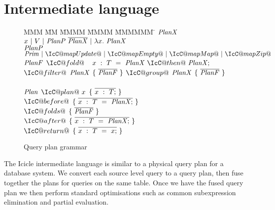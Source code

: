 \section{Intermediate language}
\label{icicle:s:IcicleCore}

\begin{figure}

\begin{tabbing}
MMM \= MM \= MMMM \= MMMM \= MMMMMM \= \kill
$\mathit{PlanX}$
\GrammarDefTab
  $x~|~V~|~\mathit{PlanP}~\overline{\mathit{PlanX}}~|~\lambda{}x.~\mathit{PlanX}$
\\
$\mathit{PlanP}$
\GrammarDefTab
  $\mi{Prim}~|~\IcC@mapUpdate@~|~\IcC@mapEmpty@~|~\IcC@mapMap@~|~\IcC@mapZip@$
\\
$\mathit{PlanF}$
\GrammarDefTab
 $\IcC@fold@$ \> $~~x~:~T~=~\mi{PlanX}~\IcC@then@~\mi{PlanX};$
\GrammarAlt
 $\IcC@filter@$ \> $\mathit{PlanX}$ \> $\{~\overline{\mathit{PlanF}}~\}$
\GrammarAlt
  $\IcC@group@$ \> $\mathit{PlanX}$ \> $\{~\overline{\mathit{PlanF}}~\}$
\\
\\
$\mathit{Plan}$
\GrammarDefTab
  $\IcC@plan@~x$ \> $\{~\overline{x~:~T;}~\}$
\\
  \> \> $\IcC@before@$ \> $\{~\overline{x~:~T~=~\mathit{PlanX};}~\}$ \\
  \> \> $\IcC@folds@$  \> $\{~\overline{\mathit{PlanF}}~\}$ \\
  \> \> $\IcC@after@$  \> $\{~\overline{x~:~T~=~\mathit{PlanX};}~\}$ \\
  \> \> $\IcC@return@$ \> $\{~\overline{x~:~T~=~x;}~\}$ \\
\end{tabbing}



\caption{Query plan grammar}
\label{icicle:fig:core:grammar}
\end{figure}

The Icicle intermediate language is similar to a physical query plan for a database system.
We convert each source level query to a query plan, then fuse together the plans for queries on the same table.
Once we have the fused query plan we then perform standard optimisations such as common subexpression elimination and partial evaluation.

